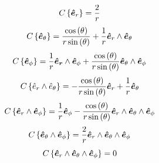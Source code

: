 \documentclass[letterpaper,10pt,english]{sphinxmanual}
\begin{document}
\begin{equation*}
C\left \{\boldsymbol{\hat{e}}_{r}\right \} =  \frac{2}{r}
\end{equation*}\begin{equation*}
C\left \{\boldsymbol{\hat{e}}_{\theta}\right \} =  \frac{\cos\left({\theta}\right)}{r \sin\left({\theta}\right)}
                              +\frac{1}{r}\boldsymbol{\hat{e}}_{r}\wedge\boldsymbol{\hat{e}}_{\theta}
\end{equation*}\begin{equation*}
C\left \{\boldsymbol{\hat{e}}_{\phi}\right \} = \frac{1}{r}{\boldsymbol{\boldsymbol{\hat{e}}_{r}}}\wedge\boldsymbol{\hat{e}}_{{\phi}}+ \frac{\cos\left({\theta}\right)}{r \sin\left({\theta}\right)}\boldsymbol{\hat{e}}_{{\theta}}\wedge\boldsymbol{\hat{e}}_{{\phi}}
\end{equation*}\begin{equation*}
C\left \{\hat{e}_{r}\wedge\hat{e}_{\theta}\right \} =  - \frac{\cos\left({\theta}\right)}{r \sin\left({\theta}\right)}
                                      \boldsymbol{\hat{e}}_{r}+\frac{1}{r}\boldsymbol{\hat{e}}_{{\theta}}
\end{equation*}\begin{equation*}
C\left \{\boldsymbol{\hat{e}}_{r}\wedge\boldsymbol{\hat{e}}_{\phi}\right \} = \frac{1}{r}\boldsymbol{\hat{e}}_{{\phi}}
                    - \frac{\cos\left({\theta}\right)}{r \sin\left({\theta}\right)}\boldsymbol{\hat{e}}_{r}\wedge\boldsymbol{\hat{e}}_{{\theta}}\wedge\boldsymbol{\hat{e}}_{{\phi}}
\end{equation*}\begin{equation*}
C\left \{\boldsymbol{\hat{e}}_{\theta}\wedge\boldsymbol{\hat{e}}_{\phi}\right \} =  \frac{2}{r}\boldsymbol{\hat{e}}_{r}\wedge
                                              \boldsymbol{\hat{e}}_{\theta}\wedge\boldsymbol{\hat{e}}_{\phi}
\end{equation*}\begin{equation*}
C\left \{\boldsymbol{\hat{e}}_r\wedge\boldsymbol{\hat{e}}_{\theta}\wedge\boldsymbol{\hat{e}}_{\phi}\right \} = 0
\end{equation*}
\end{document}

